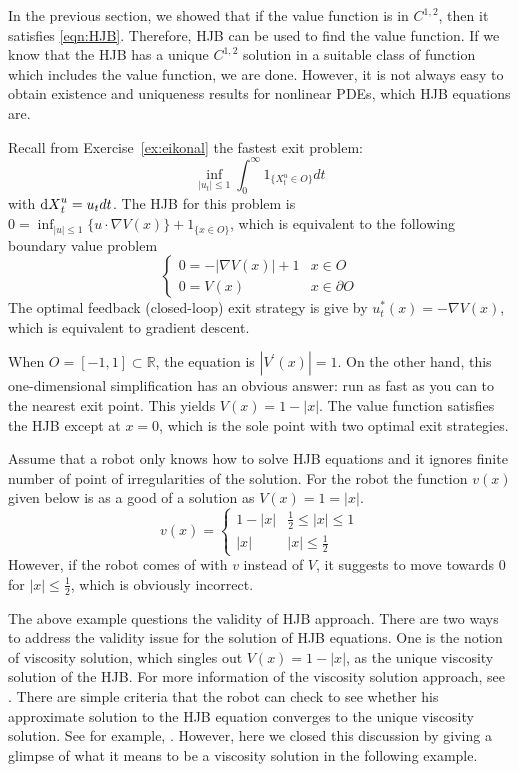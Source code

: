 \documentclass[11pt]{book}
\newcommand{\dX}{\text{\normalfont d}X}
\begin{document}
In the previous section, we showed that if the value function is in $C^{1,2}$, then it satisfies \eqref{eqn:HJB}. Therefore, HJB can be used to find the value function. If we know that the HJB has a unique $C^{1,2}$ solution in a suitable class of function which includes the value function, we are done. However, it is not always easy to obtain existence and uniqueness results for nonlinear PDEs, which HJB equations are. 
\begin{eg}
Recall from Exercise~\ref{ex:eikonal} the fastest exit problem:
\begin{equation}
    \inf_{|u_t|\le 1}\int_0^\infty 1_{\{X^u_t\in O\}} dt
\end{equation}
with ${\dX}_t^u=u_t dt$.
   The HJB for this problem is $0=\inf_{|u|\le 1}\{u\cdot \nabla V(x)\}+1_{\{x\in O\}}$, which is equivalent to the following boundary value problem
   \begin{equation}
   \begin{cases}
       0=-|\nabla V(x)|+1& x\in O\\
       0=V(x)& x\in\partial O
   \end{cases}
   \end{equation}
The optimal feedback (closed-loop) exit strategy is give by $u^*_t(x)=-\nabla V(x)$, which is equivalent to gradient descent.
   
When $O=[-1,1]\subset\mathbb{R}$, the equation is $|V^\prime(x)|=1$. On the other hand, this one-dimensional simplification has an obvious answer: run as fast as you can to the nearest exit point. This yields $V(x)=1-|x|$. The value function satisfies the HJB except at $x=0$, which is the sole point with two optimal exit strategies.

Assume that a robot only knows how to solve HJB equations and it ignores finite number of point of irregularities of the solution. For the robot the function $v(x)$ given below is as a good of a solution as $V(x)=1=|x|$. 
\begin{equation}
    v(x)=
    \begin{cases}
        1-|x| & \frac12\le |x| \le 1\\
        |x| & |x|\le \frac12
    \end{cases}
\end{equation}
However, if the robot comes of with $v$ instead of $V$, it suggests to move towards $0$ for $|x|\le \frac12$, which is obviously incorrect. 
\end{eg}
The above example questions the validity of HJB approach. There are two ways to address the validity issue for the solution of HJB equations. One is the notion of viscosity solution, which singles out $V(x)=1-|x|$, as the unique viscosity solution of the HJB. For more information of the viscosity solution approach, see \cite{CIL92}. There are simple criteria that the robot can check to see whether his approximate solution to the HJB equation converges to the unique viscosity solution. See for example, \cite{Barles-Souganidis91}. However, here we closed this discussion by giving a glimpse of what it means to be a viscosity solution in the following example.
\end{document}
